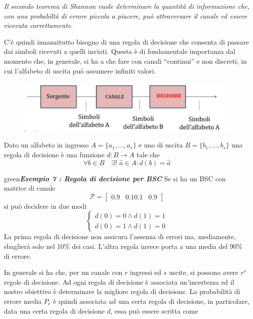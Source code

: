 \textit{Il secondo teorema di Shannon vuole determinare la quantità di informazione che, con una probabiltà di errore piccola a piacere, può attraversare il canale ed essere ricevuta correttamente}. 

C'è quindi innanzitutto bisogno di una regola di decisione che consenta di passare dai simboli ricevuti a quelli inviati. Questa \`e di fondamentale importanza dal momento che, in generale, si ha a che fare con canali “continui” e non discreti, in cui l’alfabeto di uscita può assumere infiniti valori.
\begin{figure}[H]
    \centering
    \includegraphics[scale=0.2]{img/decis.png}
\end{figure}
 Dato un alfabeto in ingresso $A = \{a_1, \dots, a_r\}$ e uno di uscita $B = \{b_1, \dots, b_s\}$ una regola di decisione \`e una funzione $d:B \to A$ tale che 
\begin{equation}
    \forall b \in B \quad  \exists ! \hspace{4pt}  \hat{a} \in A : d(b) = \hat{a}
\end{equation}
\begin{mybox}{green}{\textbf{\textit{Esempio 7 : Regola di decisione per BSC}}}
Se si ha un BSC con matrice di canale
\begin{equation*}
    \mathcal{P} = \begin{bmatrix}
    0.9 & 0.1
    0.1 & 0.9
    \end{bmatrix}
\end{equation*}
si pu\`o decidere in due modi
\begin{equation*}
    \begin{cases}
    d(0) = 0 \land d(1) = 1 \\
    d(0) = 1 \land d(1) = 0
    \end{cases}
\end{equation*}
La prima regola di decisione non assicura l'assenza di errori ma, mediamente, sbaglier\`a solo nel 10\% dei casi. L'altra regola invece porta a una media del 90\% di errore.
\end{mybox}
In generale si ha che, per un canale con $r$ ingressi ed $s$ uscite, si possono avere $r^s$ regole di decisione. Ad ogni regola di decisione \`e associata un'incertezza ed il nostro obiettivo \`e determinare la migliore regola di decisione. La probabilit\`a di errore media $P_e$ \`e quindi associata ad una certa regola di decisione, in particolare, data una certa regola di decisione $d$, essa pu\`o essere scritta come
